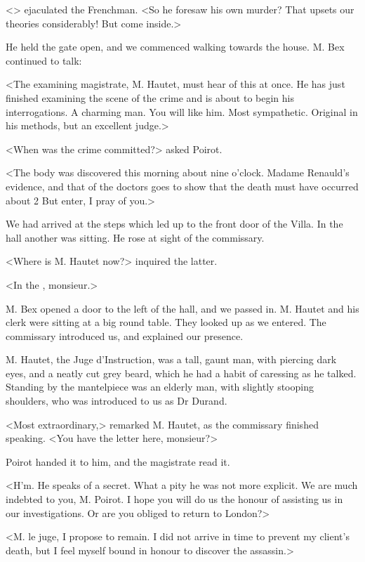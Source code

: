  <> ejaculated the Frenchman. <So he foresaw his own murder? That upsets our theories considerably! But come inside.>
 

 He held the gate open, and we commenced walking towards the house. M. Bex continued to talk: 

 <The examining magistrate, M. Hautet, must hear of this at once. He has just finished examining the scene of the crime and is about to begin his interrogations. A charming man. You will like him. Most sympathetic. Original in his methods, but an excellent judge.> 

 <When was the crime committed?> asked Poirot. 

 <The body was discovered this morning about nine o'clock. Madame Renauld's evidence, and that of the doctors goes to show that the death must have occurred about 2  But enter, I pray of you.> 

 We had arrived at the steps which led up to the front door of the Villa. In the hall another  was sitting. He rose at sight of the commissary. 

 <Where is M. Hautet now?> inquired the latter. 

 <In the , monsieur.> 

 M. Bex opened a door to the left of the hall, and we passed in. M. Hautet and his clerk were sitting at a big round table. They looked up as we entered. The commissary introduced us, and explained our presence. 

 M. Hautet, the Juge d'Instruction, was a tall, gaunt man, with piercing dark eyes, and a neatly cut grey beard, which he had a habit of caressing as he talked. Standing by the mantelpiece was an elderly man, with slightly stooping shoulders, who was introduced to us as Dr Durand. 

 <Most extraordinary,> remarked M. Hautet, as the commissary finished speaking. <You have the letter here, monsieur?> 

 Poirot handed it to him, and the magistrate read it. 

 <H'm. He speaks of a secret. What a pity he was not more explicit. We are much indebted to you, M. Poirot. I hope you will do us the honour of assisting us in our investigations. Or are you obliged to return to London?> 

 <M. le juge, I propose to remain. I did not arrive in time to prevent my client's death, but I feel myself bound in honour to discover the assassin.> 

